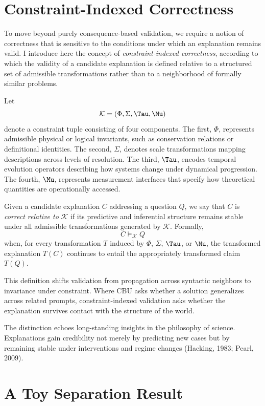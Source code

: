\documentclass[11pt]{article}
\begin{document}
\section{Constraint-Indexed Correctness}

To move beyond purely consequence-based validation, we require a notion of correctness that is sensitive to the conditions under which an explanation remains valid. I introduce here the concept of \emph{constraint-indexed correctness}, according to which the validity of a candidate explanation is defined relative to a structured set of admissible transformations rather than to a neighborhood of formally similar problems.

Let
\[
\mathcal{K} = (\Phi, \Sigma, \Tau, \Mu)
\]
denote a constraint tuple consisting of four components. The first, \(\Phi\), represents admissible physical or logical invariants, such as conservation relations or definitional identities. The second, \(\Sigma\), denotes scale transformations mapping descriptions across levels of resolution. The third, \(\Tau\), encodes temporal evolution operators describing how systems change under dynamical progression. The fourth, \(\Mu\), represents measurement interfaces that specify how theoretical quantities are operationally accessed.

Given a candidate explanation \(C\) addressing a question \(Q\), we say that \(C\) is \emph{correct relative to} \(\mathcal{K}\) if its predictive and inferential structure remains stable under all admissible transformations generated by \(\mathcal{K}\). Formally,
\[
C \models_{\mathcal{K}} Q
\]
when, for every transformation \(T\) induced by \(\Phi\), \(\Sigma\), \(\Tau\), or \(\Mu\), the transformed explanation \(T(C)\) continues to entail the appropriately transformed claim \(T(Q)\).

This definition shifts validation from propagation across syntactic neighbors to invariance under constraint. Where CBU asks whether a solution generalizes across related prompts, constraint-indexed validation asks whether the explanation survives contact with the structure of the world.

The distinction echoes long-standing insights in the philosophy of science. Explanations gain credibility not merely by predicting new cases but by remaining stable under interventions and regime changes (Hacking, 1983; Pearl, 2009).

\section{A Toy Separation Result}
\end{document}
